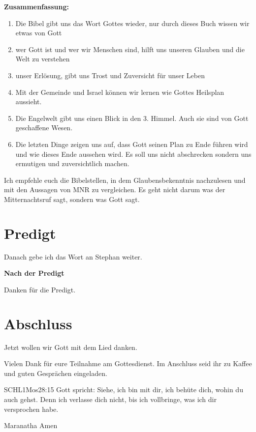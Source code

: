 \documentclass{../../inc/mybib}
\begin{document}
\begin{spacing}{1.5}
    \textbf{Zusammenfassung:} 
    \begin{enumerate}
        \item Die Bibel gibt uns das Wort Gottes wieder, nur durch dieses Buch wissen wir etwas von Gott
        \item wer Gott ist und wer wir Menschen sind, hilft uns unseren Glauben und die Welt zu verstehen
        \item unser Erlösung, gibt uns Trost und Zuversicht für unser Leben
        \item Mit der Gemeinde und Israel können wir lernen wie Gottes Heilsplan aussieht. 
        \item Die Engelwelt gibt uns einen Blick in den 3. Himmel. Auch sie sind von Gott geschaffene Wesen.
        \item Die letzten Dinge zeigen uns auf, dass Gott seinen Plan zu Ende führen wird und wie dieses Ende aussehen wird. Es soll uns nicht abschrecken sondern uns ermutigen und zuversichtlich machen.
    \end{enumerate}
    Ich empfehle euch die Bibelstellen, in dem Glaubensbekenntnis nachzulesen und mit den Aussagen von MNR zu vergleichen. Es geht nicht darum was der Mitternachtsruf sagt, sondern was Gott sagt.
\end{spacing}

\section{Predigt}

Danach gebe ich das Wort an Stephan weiter.

\textbf{Nach der Predigt}

Danken für die Predigt.






\section{Abschluss}

Jetzt wollen wir Gott mit dem Lied  danken.

Vielen Dank für eure Teilnahme am Gottesdienst. Im Anschluss seid ihr zu Kaffee und guten Gesprächen eingeladen.
\beten{}

\begin{bibelbox}{SCHL}{1Mos}{28:15}
Gott spricht: Siehe, ich bin mit dir,
ich behüte dich, wohin du auch gehst.
Denn ich verlasse dich nicht,
bis ich vollbringe, was ich dir versprochen habe.
\end{bibelbox}

Maranatha Amen
\end{document}
